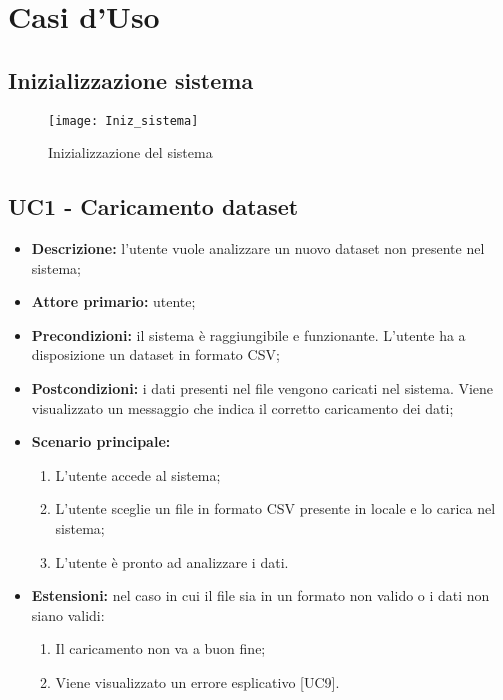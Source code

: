 \chapter{Casi d'Uso}

\section*{Inizializzazione sistema}

\begin{figure}[ht]
  \centering
  \texttt{[image: Iniz\_sistema]}
  \caption{Inizializzazione del sistema}
\end{figure}
\section{UC1 - Caricamento dataset}
\begin{itemize}
  \item \textbf{Descrizione:} l'utente vuole analizzare un nuovo dataset non presente nel sistema;
  \item \textbf{Attore primario:} utente;
  \item \textbf{Precondizioni:} il sistema è raggiungibile e funzionante. L’utente ha a disposizione un dataset in formato CSV;
  \item \textbf{Postcondizioni:} i dati presenti nel file vengono caricati nel sistema. Viene visualizzato un messaggio che indica il corretto caricamento dei dati;
  \item \textbf{Scenario principale:}
  \begin{enumerate}
    \item L'utente accede al sistema;
    \item L'utente sceglie un file in formato CSV presente in locale e lo carica nel sistema;
    \item L'utente è pronto ad analizzare i dati.
  \end{enumerate}
  \item \textbf{Estensioni:} nel caso in cui il file sia in un formato non valido o i dati non siano validi:
    \begin{enumerate}
      \item Il caricamento non va a buon fine;
      \item Viene visualizzato un errore esplicativo [UC9].
    \end{enumerate}
\end{itemize}

